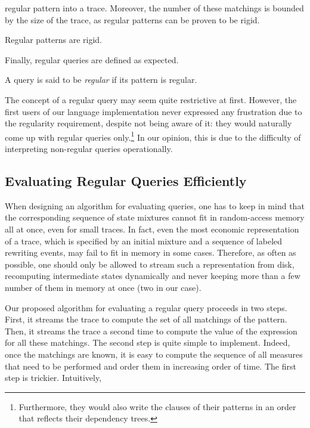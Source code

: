 \documentclass[runningheads]{llncs}
\begin{document}
regular pattern into a trace. Moreover, the number of
these matchings is bounded by the size of the trace, as regular
patterns can be proven to be rigid.
\begin{proposition}\label{prop:regular-rigid}
  Regular patterns are rigid.
\end{proposition}
Finally, regular queries are defined as expected.
\begin{definition}
  A query is said to be \emph{regular} if its pattern is regular.
\end{definition}
The concept of a regular query may seem quite restrictive at
first. However, the first users of our language implementation never
expressed any frustration due to the regularity requirement, despite
not being aware of it: they would naturally come up with regular
queries only.\footnote{Furthermore, they would also write the clauses
  of their patterns in an order that reflects their dependency trees.}
In our opinion, this is due to the difficulty of interpreting
non-regular queries operationally.


\subsection{Evaluating Regular Queries
  Efficiently}\label{subsec:evalq}

When designing an algorithm for evaluating queries, one has to keep in
mind that the corresponding sequence of state mixtures cannot fit in
random-access memory all at once, even for small traces. In fact, even
the most economic representation of a trace, which is specified by an
initial mixture and a sequence of labeled rewriting events, may fail
to fit in memory in some cases. Therefore, as often as possible, one
should only be allowed to stream such a representation from disk, recomputing
intermediate states dynamically and never keeping more than a few number
of them in memory at once (two in our case).

Our proposed algorithm for evaluating a regular query proceeds in two
steps. First, it streams the trace to compute the set of all matchings
of the pattern. Then, it streams the trace a second time to compute
the value of the expression for all these matchings. The second step
is quite simple to implement. Indeed, once the matchings are known, it
is easy to compute the sequence of all measures that need to be
performed and order them in increasing order of time. The first step
is trickier. Intuitively, 
\end{document}
